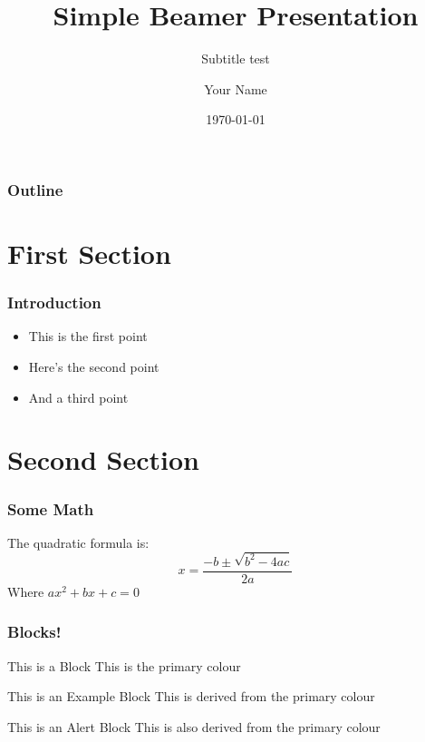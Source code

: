 \documentclass[10pt, aspectratio = 169]{beamer}
\title{Simple Beamer Presentation}
\subtitle{Subtitle test}
\author{Your Name}
\institute{Your Institution}
\date{\today}
\begin{document}
\begin{frame}
    \titlepage
\end{frame}

\begin{frame}
    \frametitle{Outline}
    \tableofcontents
\end{frame}

\section{First Section}
\begin{frame}
    \frametitle{Introduction}
    \begin{itemize}
        \item This is the first point
        \item Here's the second point
        \item And a third point
    \end{itemize}
\end{frame}

\section{Second Section}
\begin{frame}
    \frametitle{Some Math}
    The quadratic formula is:
    \[x = \frac{-b \pm \sqrt{b^2 - 4ac}}{2a}\]
    Where $ax^2 + bx + c = 0$
\end{frame}

\begin{frame}
    \frametitle{Blocks!}

    \begin{block}{This is a Block}
        This is the primary colour
    \end{block}
    
    \begin{exampleblock}{This is an Example Block}
        This is derived from the primary colour
    \end{exampleblock}
    
    \begin{alertblock}{This is an Alert Block}
        This is also derived from the primary colour
    \end{alertblock}
    
\end{frame}
\end{document}

